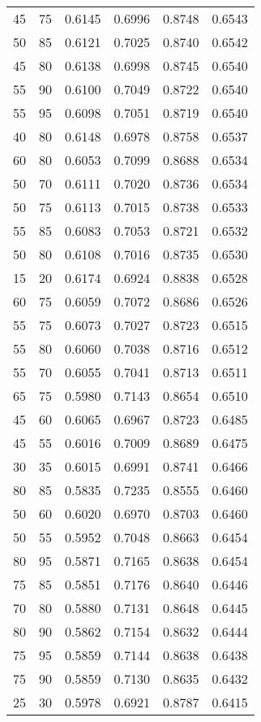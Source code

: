 \begin{center}
\begin{longtable}{|l|l|l|l|l|l|}
45 & 75 & 0.6145 & 0.6996 & 0.8748 & 0.6543 \\
50 & 85 & 0.6121 & 0.7025 & 0.8740 & 0.6542 \\
45 & 80 & 0.6138 & 0.6998 & 0.8745 & 0.6540 \\
55 & 90 & 0.6100 & 0.7049 & 0.8722 & 0.6540 \\
55 & 95 & 0.6098 & 0.7051 & 0.8719 & 0.6540 \\
40 & 80 & 0.6148 & 0.6978 & 0.8758 & 0.6537 \\
60 & 80 & 0.6053 & 0.7099 & 0.8688 & 0.6534 \\
50 & 70 & 0.6111 & 0.7020 & 0.8736 & 0.6534 \\
50 & 75 & 0.6113 & 0.7015 & 0.8738 & 0.6533 \\
55 & 85 & 0.6083 & 0.7053 & 0.8721 & 0.6532 \\
50 & 80 & 0.6108 & 0.7016 & 0.8735 & 0.6530 \\
15 & 20 & 0.6174 & 0.6924 & 0.8838 & 0.6528 \\
60 & 75 & 0.6059 & 0.7072 & 0.8686 & 0.6526 \\
55 & 75 & 0.6073 & 0.7027 & 0.8723 & 0.6515 \\
55 & 80 & 0.6060 & 0.7038 & 0.8716 & 0.6512 \\
55 & 70 & 0.6055 & 0.7041 & 0.8713 & 0.6511 \\
65 & 75 & 0.5980 & 0.7143 & 0.8654 & 0.6510 \\
45 & 60 & 0.6065 & 0.6967 & 0.8723 & 0.6485 \\
45 & 55 & 0.6016 & 0.7009 & 0.8689 & 0.6475 \\
30 & 35 & 0.6015 & 0.6991 & 0.8741 & 0.6466 \\
80 & 85 & 0.5835 & 0.7235 & 0.8555 & 0.6460 \\
50 & 60 & 0.6020 & 0.6970 & 0.8703 & 0.6460 \\
50 & 55 & 0.5952 & 0.7048 & 0.8663 & 0.6454 \\
80 & 95 & 0.5871 & 0.7165 & 0.8638 & 0.6454 \\
75 & 85 & 0.5851 & 0.7176 & 0.8640 & 0.6446 \\
70 & 80 & 0.5880 & 0.7131 & 0.8648 & 0.6445 \\
80 & 90 & 0.5862 & 0.7154 & 0.8632 & 0.6444 \\
75 & 95 & 0.5859 & 0.7144 & 0.8638 & 0.6438 \\
75 & 90 & 0.5859 & 0.7130 & 0.8635 & 0.6432 \\
25 & 30 & 0.5978 & 0.6921 & 0.8787 & 0.6415 \\

\end{longtable}
\end{center}

